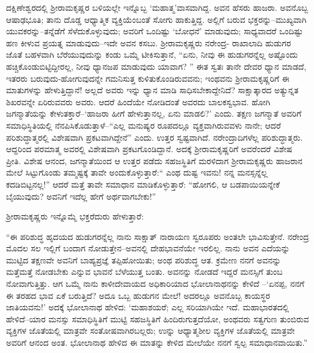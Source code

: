 ದಕ್ಷಿಣೇಶ್ವರದಲ್ಲಿ ಶ್ರೀರಾಮಕೃಷ್ಣರ ಬಳಿಯಲ್ಲೇ ಇನ್ನೊಬ್ಬ ‘ಮಹಾತ್ಮ’ವಾಸವಾಗಿದ್ದ. ಅವನ ಹೆಸರು ಹಾಜರಾ. ಅವನೊಬ್ಬ ಆಷಾಢಭೂತಿ; ತಾನು ದೊಡ್ಡ ಆಧ್ಯಾತ್ಮಿಕ ವ್ಯಕ್ತಿಯೆಂಬಂತೆ ಸೋಗು ಹಾಕುತ್ತಿದ್ದ. ಅಲ್ಲಿಗೆ ಬರುವ ಭಕ್ತರನ್ನು–ಮುಖ್ಯವಾಗಿ ಯುವಕರನ್ನು–ತನ್ನೆಡೆಗೆ ಸೆಳೆದುಕೊಳ್ಳುವುದು; ಅವರಿಗೆ ಒಂದಿಷ್ಟು ‘ಬೋಧನೆ’ ಮಾಡುವುದು; ಸಾಧ್ಯವಾದರೆ ಒಂದಿಷ್ಟು ಹಣ ಕೀಳುವ ಪ್ರಯತ್ನ ಮಾಡುವುದು–ಇದೇ ಅವನ ಕಸಬು. ಶ್ರೀರಾಮಕೃಷ್ಣರು ನರೇಂದ್ರ- ರಾಖಾಲಾದಿ ಹುಡುಗರ ಜೊತೆ ಬಹಳವಾಗಿ ಬೆರೆಯುವುದುನ್ನು ಕಂಡು ಒಮ್ಮೆ ಟೀಕಿಸುತ್ತಾನೆ, “ಏನು, ನೀವು ಈ ಹುಡುಗರನ್ನೆಲ್ಲ ಅಷ್ಟೊಂದು ಹಚ್ಚಿಕೊಂಡುಬಿಟ್ಟಿದ್ದೀರಲ್ಲ, ನೀವು ಧ್ಯಾನಜಪ ಮಾಡುವುದು ಯಾವಾಗ? ” ಈತ ಸ್ವತಃ ತಾನೇ ದೇವರ ಧ್ಯಾನ ಮಾಡದೆ, ಇತರರು ಬರುವುದು-ಹೋಗುವುದನ್ನೇ ಗಮನಿಸುತ್ತ ಕುಳಿತುಕೊಂಡಿರುವವನು; ಇಂಥವನು ಶ್ರೀರಾಮಕೃಷ್ಣರಿಗೆ ಈ ಮಾತುಗಳನ್ನು ಹೇಳುತ್ತಿದ್ದಾನೆ! ಅಲ್ಲದೆ ಅವರು ಇನ್ನು ಧ್ಯಾನ ಮಾಡಿ ಸಾಧಿಸಬೇಕಾದ್ದೇನಿದೆ? ಸಾಕ್ಷಾತ್ಕಾರದ ಅತ್ಯುನ್ನತ ಶಿಖರವನ್ನೇ ಏರಿರುವವರು ಅವರು. ಆದರೆ ಹಿಂದೆಯೇ ನೋಡಿದಂತೆ ಅವರದು ಬಾಲಕಸ್ವಭಾವ. ಹೋಗಿ ಜಗನ್ಮಾತೆಯನ್ನು ಕೇಳುತಕ್ತಾರೆ–‘ಹಾಜರಾ ಹೀಗೆ ಹೇಳುತ್ತಾನಲ್ಲ, ಏನು ಮಾಡಲಿ?’ ಎಂದು. ತಕ್ಷಣ ಜಗನ್ಮಾತೆ ಅವರಿಗೆ ಸಮಾಧಿಸ್ಥಿತಿಯಲ್ಲಿ ನೆನಪಿಸಿಕೊಡುತ್ತಾಳೆ–“ಎಲ್ಲ ಮನುಷ್ಯರ ರೂಪದಲ್ಲೂ ವ್ಯಕ್ತವಾಗಿರುವವಳು ನಾನೇ; ಆದರೆ ಪರಿಶುದ್ಧಾತ್ಮರಲ್ಲಿ ವಿಶೇಷವಾಗಿ ಪ್ರಕಟವಾಗಿದ್ದೇನೆ” ಎಂದು. ಉತ್ತರ ಸ್ವಷ್ಟವಾಗಿದೆ. ನರೇಂದ್ರಾದಿಗಳೆಲ್ಲ ಪರಿಶುದ್ಧಾತ್ಮರು. ಆದ್ದರಿಂದ ಪರಮಾತ್ಮ ಅವರಲ್ಲಿ ವಿಶೇಷವಾಗಿ ಪ್ರಕಟಗೊಂಡಿದ್ದಾನೆ. ಅದಕ್ಕೆ ಶ್ರೀರಾಮಕೃಷ್ಣರಿಗೆ ಅವರೆಂದರೆ ವಿಶೇಷ ಪ್ರೀತಿ. ವಿಶೇಷ ಆನಂದ, ಜಗನ್ಮಾತೆಯಿಂದ ಆ ಉತ್ತರ ಪಡೆದು ಸಹಜಸ್ಥಿತಿಗೆ ಮರಳಿದಾಗ ಶ್ರೀರಾಮಕೃಷ್ಣರು ಹಾಜರಾನ ಮೇಲೆ ಸಿಟ್ಟುಗೊಂಡು ತಮ್ಮಷ್ಟಕ್ಕೆ ತಾವೇ ಅಂದುಕೊಳ್ಳುತ್ತಾರೆ:“ ಎಂಥ ದುಷ್ಟ ಇವನು! ನನ್ನ ಮನಸ್ಸನ್ನೆಲ್ಲ ಕದಡಿಬಿಟ್ಟನಲ್ಲ!” ಆದರೆ ಮತ್ತೆ ತಾವೇ ಸಮಾಧಾನ ಮಾಡಿಕೊಳ್ಳುತ್ತಾರೆ: “ಹೋಗಲಿ, ಆ ಬಡಪಾಯಿಯನ್ನೇಕೆ ಬೈಯುವುದು? ಅವನಿಗೆ ಇದೆಲ್ಲ ಹೇಗೆ ಅರ್ಥವಾಗಬೇಕು!”

ಶ್ರೀರಾಮಕೃಷ್ಣರು ಇನ್ನೊಮ್ಮೆ ಭಕ್ತರೆದುರು ಹೇಳುತ್ತಾರೆ:

“ಈ ಪರಿಶುದ್ಧ ಹೃದಯದ ಹುಡುಗರನ್ನೆಲ್ಲ ನಾನು ಸಾಕ್ಷಾತ್ ನಾರಾಯಣ ಸ್ವರೂಪರು ಅಂತಲೇ ಭಾವಿಸುತ್ತೇನೆ. ನರೇಂದ್ರ ಮೊದಲ ಸಲ ಇಲ್ಲಿಗೆ ಬಂದಾಗ ನೋಡುತ್ತೇನ–ಅವನಲ್ಲಿ ದೇಹಭಾವನೆಯೇ ಇರಲಿಲ್ಲ. ನಾನು ಅವನ ಎದೆಯನ್ನು ಮುಟ್ಟಿದ ತಕ್ಷಣವೇ ಅವನಿಗೆ ಬಾಹ್ಯಪ್ರಜ್ಞೆ ತಪ್ಪಿಹೋಯಿತು; ಅಂಥ ಪರಿಶುದ್ಧ ಆತ. ಕ್ರಮೇಣ ನನಗೆ ಅವನನ್ನು ಮತ್ತೆಮತ್ತೆ ನೋಡಬೇಕು ಎನ್ನುವ ಭಾವನೆ ಬೆಳೆಯುತ್ತ ಬಂತು. ಅವನನ್ನು ನೋಡದೆ ಇದ್ದರೆ ಮನಸ್ಸಿಗೆ ತುಂಬ ನೋವಾಗುತ್ತಿತ್ತು. ಆಗ ಒಮ್ಮೆ ನಾನು ಕಾಳೀದೇವಾಯದ ಅಧಿಕಾರಿಯಾದ ಭೋಲಾನಾಥನನ್ನು ಕೇಳಿದೆ –‘ಏನಪ್ಪ, ನನಗೆ ಈ ತರಹದ ಭಾವ ಏಕೆ ಬರುತ್ತಿದೆ? ಅದೂ ಒಬ್ಬ ಹುಡುಗನ ಮೇಲೆ! ಅದರಲ್ಲೂ ಅವನೊಬ್ಬ ಕಾಯಸ್ಥರ ಜಾತಿಯವನು!’ ಅದಕ್ಕೆ ಭೋಲಾನಾಥ ಹೇಳಿದ: ‘ಮಹಾಶಯರೆ; ಎಲ್ಲ ಸರಿಯಾಗಿಯೇ ಇದೆ. ಮಹಾಭಾರತದಲ್ಲಿ ಹೇಳಿದೆ–ಯಾರ ಮನಸ್ಸು ಸಮಾಧಿಸ್ಥಿತಿಗೆ ಮುಟ್ಟಿ ಸಹಜಸ್ಥಿತಿಗೆ ಹಿಂದಿರುಗುತ್ತದೆಯೋ, ಅಂಥವರು ಸತ್ವಗುಣ ತುಂಬಿರುವ ವ್ಯಕ್ತಿಗಳ ಜೊತೆಯಲ್ಲಿ ಮಾತ್ರವೇ ಸಂತೋಷವಾಗಿರಬಲ್ಲರು; ಉನ್ನು ಆಧ್ಯಾತ್ಮಶೀಲ ವ್ಯಕ್ತಿಗಳ ಜೊತೆಯಲ್ಲಿ ಮಾತ್ರವೇ ಅವರಿಗೆ ಆನಂದ ಅಂತ. ಭೋಲಾನಾಥ ಹೇಳಿದ ಈ ಮಾತನ್ನು ಕೇಳಿದ ಮೇಲೆಯೇ ನನಗೆ ಸ್ವಲ್ಪ ಸಮಾಧಾನವಾಯಿತು.”

